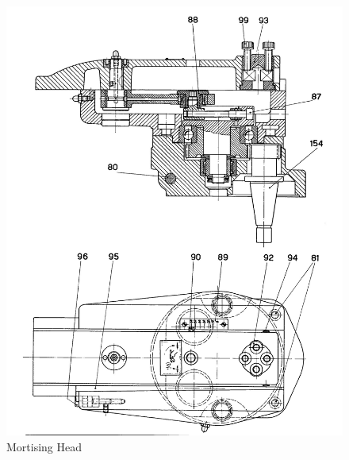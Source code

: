 \newpage
\begin{figure}[h]
    \centering
    \includegraphics[width=1.0\linewidth]{./images/page_39}
    \caption{Mortising Head}
    \label{fig:mortising_head}
\end{figure}
